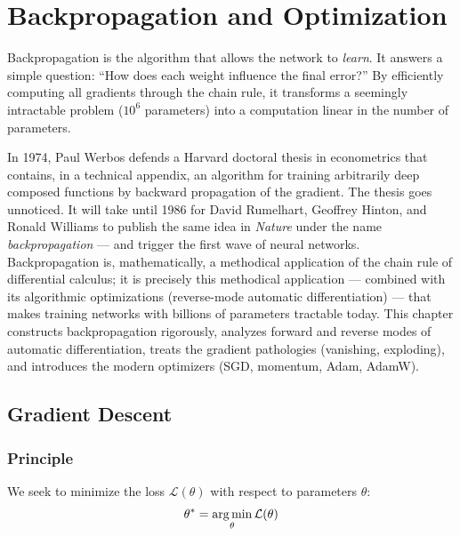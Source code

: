 \chapter{Backpropagation and Optimization}
\label{ch:backpropagation}

\begin{intuition}
Backpropagation is the algorithm that allows the network to \emph{learn}. It answers a simple question: ``How does each weight influence the final error?'' By efficiently computing all gradients through the chain rule, it transforms a seemingly intractable problem ($10^6$ parameters) into a computation linear in the number of parameters.
\end{intuition}

In 1974, Paul Werbos defends a Harvard doctoral thesis in econometrics that contains, in a technical appendix, an algorithm for training arbitrarily deep composed functions by backward propagation of the gradient. The thesis goes unnoticed. It will take until 1986 for David Rumelhart, Geoffrey Hinton, and Ronald Williams to publish the same idea in \emph{Nature} under the name \emph{backpropagation} --- and trigger the first wave of neural networks. Backpropagation is, mathematically, a methodical application of the chain rule of differential calculus; it is precisely this methodical application --- combined with its algorithmic optimizations (reverse-mode automatic differentiation) --- that makes training networks with billions of parameters tractable today. This chapter constructs backpropagation rigorously, analyzes forward and reverse modes of automatic differentiation, treats the gradient pathologies (vanishing, exploding), and introduces the modern optimizers (SGD, momentum, Adam, AdamW).

\section{Gradient Descent}
\label{sec:gradient_descent}

\subsection{Principle}

We seek to minimize the loss $\mathcal{L}(\theta)$ with respect to parameters $\theta$:
\[
\theta^* = \operatorname*{arg\,min}_\theta \mathcal{L}(\theta)
\]

